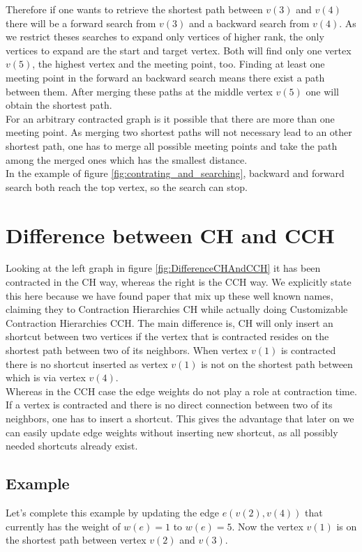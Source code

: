 Therefore if one wants to retrieve the shortest path between $v(3)$ and $v(4)$ there will be a forward search from $v(3)$ and a backward search from $v(4)$.
As we restrict theses searches to expand only vertices of higher rank, the only vertices to expand are the start and target vertex.
Both will find only one vertex $v(5)$, the highest vertex and the meeting point, too.
Finding at least one meeting point in the forward an backward search means there exist a path between them.
After merging these paths at the middle vertex $v(5)$ one will obtain the shortest path.
\\
For an arbitrary contracted graph is it possible that there are more than one meeting point.
As merging two shortest paths will not necessary lead to an other shortest path, one has to merge all possible meeting points and take the path among the merged ones which has the smallest distance.
\\ 
In the example of figure \ref{fig:contrating_and_searching}, backward and forward search both reach the top vertex, so the search can stop.

\section{Difference between CH and CCH}

Looking at the left graph in figure \ref{fig:DifferenceCHAndCCH} it has been contracted in the CH way, whereas the right is the CCH way.
We explicitly state this here because we have found paper \cite{Ouyang_2020} that mix up these well known names, claiming they to Contraction Hierarchies CH while actually doing Customizable Contraction Hierarchies CCH.
The main difference is, CH will only insert an shortcut between two vertices if the vertex that is contracted resides on the shortest path between two of its neighbors.
When vertex $v(1)$ is contracted there is no shortcut inserted as vertex $v(1)$ is not on the shortest path between which is via vertex $v(4)$.
\\
Whereas in the CCH case the edge weights do not play a role at contraction time.
If a vertex is contracted and there is no direct connection between two of its neighbors, one has to insert a shortcut.
This gives the advantage that later on we can easily update edge weights without inserting new shortcut, as all possibly needed shortcuts already exist.
\\
\subsection{Example} 
Let's complete this example by updating the edge $e(v(2), v(4))$ that currently has the weight of $w(e)=1$ to $w(e) = 5$.
Now the vertex $v(1)$ is on the shortest path between vertex $v(2)$ and $v(3)$.

